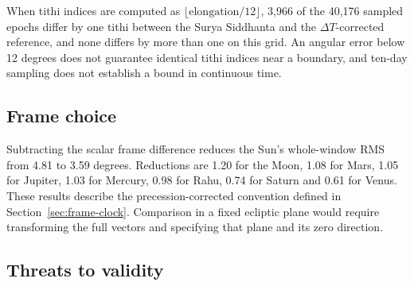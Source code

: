 \documentclass[11pt,a4paper]{article}
\newcommand{\dT}{$\Delta T$}
\begin{document}
When tithi indices are computed as $\lfloor \text{elongation}/12 \rfloor$, 3,966 of the 40,176 sampled epochs differ by one tithi between the Surya Siddhanta and the \dT{}-corrected reference, and none differs by more than one on this grid. An angular error below 12 degrees does not guarantee identical tithi indices near a boundary, and ten-day sampling does not establish a bound in continuous time.

\subsection{Frame choice}

Subtracting the scalar frame difference reduces the Sun's whole-window RMS from 4.81 to 3.59 degrees. Reductions are 1.20 for the Moon, 1.08 for Mars, 1.05 for Jupiter, 1.03 for Mercury, 0.98 for Rahu, 0.74 for Saturn and 0.61 for Venus. These results describe the precession-corrected convention defined in Section~\ref{sec:frame-clock}. Comparison in a fixed ecliptic plane would require transforming the full vectors and specifying that plane and its zero direction.

\subsection{Threats to validity}
\label{sec:threats}
\end{document}
